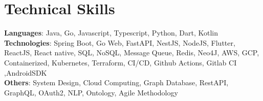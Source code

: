 \section{Technical Skills}
    \begin{itemize}[leftmargin=0.15in, label={}]
	\small{\item{
		\textbf{Languages}{: Java, Go, Javascript, Typescript, Python, Dart, Kotlin} \\
		\textbf{Technologies}{: Spring Boot, Go Web, FastAPI, NestJS, NodeJS, Flutter, ReactJS, React native, SQL, NoSQL, Message Queue, Redis, Neo4J, AWS, GCP, Containerized, Kubernetes, Terraform, CI/CD, Github Actions, Gitlab CI ,AndroidSDK} \\
		\textbf{Others}{: System Design, Cloud Computing, Graph Database, RestAPI, GraphQL, OAuth2, NLP, Ontology, Agile Methodology}
	}}
    \end{itemize}